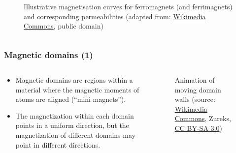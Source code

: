 \begin{frame}
\begin{columns}
\begin{column}{0.425\textwidth}
\begin{figure}
				\caption{Illustrative magnetisation curves for ferromagnets (and ferrimagnets) and corresponding permeabilities  (adapted from: \href{https://commons.wikimedia.org/wiki/File:Permeability_of_ferromagnet_by_Zureks.svg}{Wikimedia Commons}, public domain)}
			\end{figure}
		\end{column}
		\end{columns}
\end{frame}


\begin{frame}
	\frametitle{Magnetic domains (1)}
    \begin{columns}
	\begin{column}{0.48\textwidth}
    \begin{itemize}
        \item Magnetic domains are regions within a material where the magnetic moments of atoms are aligned (``mini magnets'').
        \item The magnetization within each domain points in a uniform direction, but the magnetization of different domains may point in different directions.
    \end{itemize}
    \end{column}
    \hfill
    \begin{column}{0.52\textwidth}
        \begin{figure}
            \centering
            \caption{Animation of moving domain walls (source: \href{https://commons.wikimedia.org/wiki/File:Moving_magnetic_domains_by_Zureks.gif}{Wikimedia Commons}, Zureks, \href{https://creativecommons.org/licenses/by-sa/3.0/deed.en}{CC BY-SA 3.0})}
        \end{figure}

\end{column}
\end{columns}
\end{frame}

